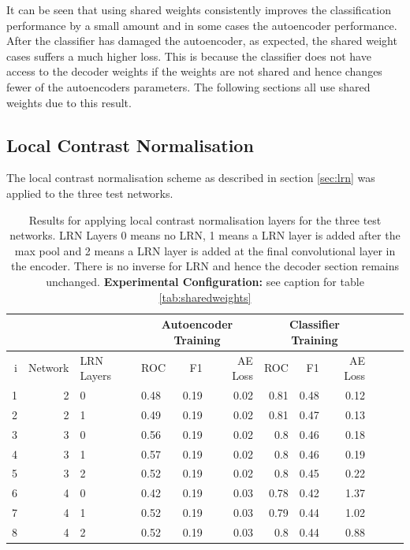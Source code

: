       It can be seen that using shared weights consistently improves the classification
      performance by a small amount and in some cases the autoencoder performance. After the classifier has
      damaged the autoencoder, as expected, the shared weight cases suffers a much higher loss. This is
      because the classifier does not have access to the decoder weights if the weights are not shared and hence
      changes fewer of the autoencoders parameters. The following sections all use shared weights due to this result.
    \newpage
    \subsection{Local Contrast Normalisation}

      The local contrast normalisation scheme as described in section \ref{sec:lrn}
      was applied to the three test networks.

      \begin{table}[!h] \centering
        \footnotesize{
        \begin{tabular}{rrllrrrrrrrr}
          &&&   \multicolumn{3}{|c|}{Autoencoder Training} &  \multicolumn{3}{c|}{Classifier Training}    \\
        \hline
          i & Network             & LRN Layers   &    ROC&F1&AE Loss & ROC & F1 & AE Loss \\
        \hline
         1 & 2 & 0  &    0.48 &   0.19 &     0.02 &    0.81 &   0.48 &     0.12 \\
         2 & 2 & 1  &    0.49 &   0.19 &     0.02 &    0.81 &   0.47 &     0.13 \\
        \hline
         3 & 3 & 0  &    0.56 &   0.19 &     0.02 &    0.8  &   0.46 &     0.18 \\
         4 & 3 & 1  &    0.57 &   0.19 &     0.02 &    0.8  &   0.46 &     0.19 \\
         5 & 3 & 2  &    0.52 &   0.19 &     0.02 &    0.8  &   0.45 &     0.22 \\
        \hline
         6 & 4 & 0  &    0.42 &   0.19 &     0.03 &    0.78 &   0.42 &     1.37 \\
         7 & 4 & 1  &    0.52 &   0.19 &     0.03 &    0.79 &   0.44 &     1.02 \\
         8 & 4 & 2  &    0.52 &   0.19 &     0.03 &    0.8  &   0.44 &     0.88 \\
        \hline
        \end{tabular}}

        \caption{Results for applying local contrast normalisation layers
        for the three test networks. LRN Layers 0 means no LRN, 1 means a LRN layer is added after the max pool
        and 2 means a LRN layer is added at the final convolutional layer in the encoder. There is no
        inverse for LRN and hence the decoder section remains unchanged. {\bf Experimental Configuration:} see caption
        for table \ref{tab:sharedweights}
        }
        \label{tab:lrn}
      \end{table}

